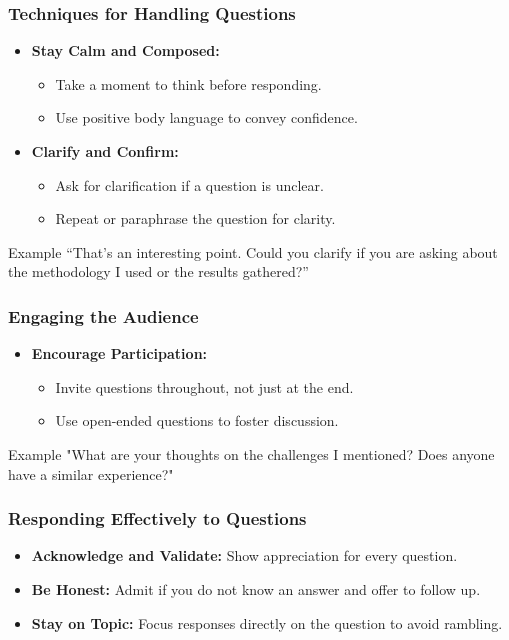 \documentclass[aspectratio=169]{beamer}
\begin{document}
\begin{frame}[fragile]
    \frametitle{Techniques for Handling Questions}
    \begin{itemize}
        \item \textbf{Stay Calm and Composed:} 
        \begin{itemize}
            \item Take a moment to think before responding.
            \item Use positive body language to convey confidence.
        \end{itemize}

        \item \textbf{Clarify and Confirm:} 
        \begin{itemize}
            \item Ask for clarification if a question is unclear.
            \item Repeat or paraphrase the question for clarity.
        \end{itemize}
    \end{itemize}
    \begin{block}{Example}
        “That's an interesting point. Could you clarify if you are asking about the methodology I used or the results gathered?”
    \end{block}
\end{frame}

\begin{frame}[fragile]
    \frametitle{Engaging the Audience}
    \begin{itemize}
        \item \textbf{Encourage Participation:} 
        \begin{itemize}
            \item Invite questions throughout, not just at the end.
            \item Use open-ended questions to foster discussion.
        \end{itemize}
    \end{itemize}
    \begin{block}{Example}
        "What are your thoughts on the challenges I mentioned? Does anyone have a similar experience?"
    \end{block}
\end{frame}

\begin{frame}[fragile]
    \frametitle{Responding Effectively to Questions}
    \begin{itemize}
        \item \textbf{Acknowledge and Validate:} Show appreciation for every question.
        \item \textbf{Be Honest:} Admit if you do not know an answer and offer to follow up.
        \item \textbf{Stay on Topic:} Focus responses directly on the question to avoid rambling.
    \end{itemize}
\end{frame}
\end{document}
